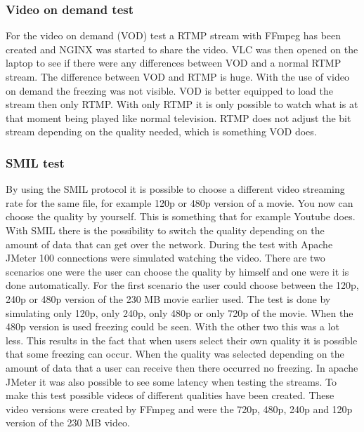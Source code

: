 \documentclass{sig-alternate-br}
\begin{document}
\subsubsection{Video on demand test}
For the video on demand (VOD) test a RTMP stream with FFmpeg has been created and NGINX was started to share the video. VLC was then opened on the laptop to see if there were any differences between VOD and a normal RTMP stream. The difference between VOD and RTMP is huge. With the use of video on demand the freezing was not visible. VOD is better equipped to load the stream then only RTMP. With only RTMP it is only possible to watch what is at that moment being played like normal television. RTMP does not adjust the bit stream depending on the quality needed, which is something VOD does.

\subsubsection{SMIL test}
By using the SMIL protocol it is possible to choose a different video streaming rate for the same file, for example 120p or 480p version of a movie. You now can choose the quality by yourself. This is something that for example Youtube does. With SMIL there is the possibility to switch the quality depending on the amount of data that can get over the network. During the test with Apache JMeter 100 connections were simulated watching the video. There are two scenarios one were the user can choose the quality by himself and one were it is done automatically. For the first scenario the user could choose between the 120p, 240p or 480p version of the 230 MB movie earlier used. The test is done by simulating only 120p, only 240p, only 480p or only 720p of the movie. When the 480p version is used freezing could be seen. With the other two this was a lot less. This results in the fact that when users select their own quality it is possible that some freezing can occur. When the quality was selected depending on the amount of data that a user can receive then there occurred no freezing. In apache JMeter it was also possible to see some latency when testing the streams. To make this test possible videos of different qualities have been created. These video versions were created by FFmpeg and were the 720p, 480p, 240p and 120p version of the 230 MB video. 
\end{document}
